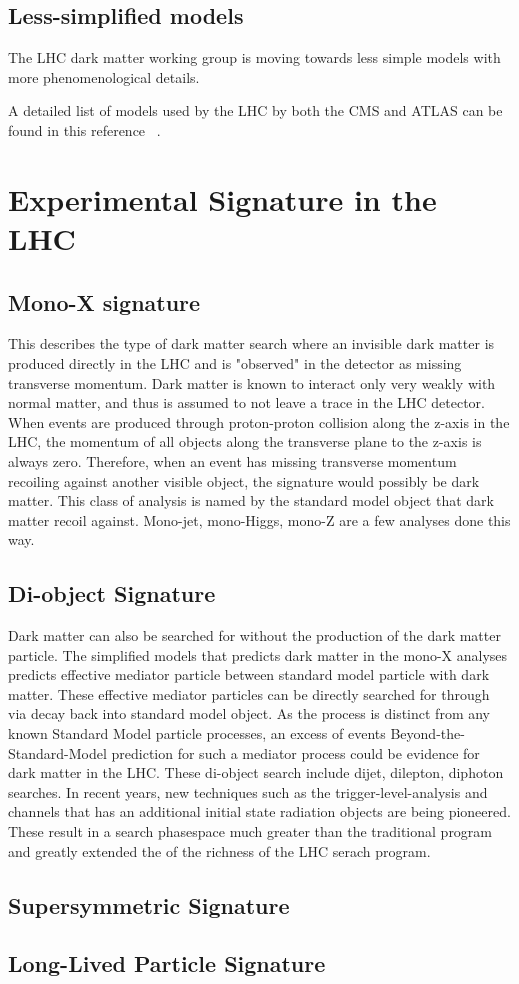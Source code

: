 \subsection{Less-simplified models}
The LHC dark matter working group is moving towards less simple models with more phenomenological details.

A detailed list of models used by the LHC by both the CMS and ATLAS can be found in this reference ~\cite{Abercrombie_2020}.

\section{Experimental Signature in the LHC}
\label{section:signatures}

\subsection{Mono-X signature}
    This describes the type of dark matter search where an invisible dark matter is produced directly in the LHC and is "observed" in the detector as missing transverse momentum.
    Dark matter is known to interact only very weakly with normal matter, and thus is assumed to not leave a trace in the LHC detector. When events are produced through proton-proton collision along the z-axis in the LHC, the momentum of all objects along the transverse plane to the z-axis is always zero. Therefore, when an event has missing transverse momentum recoiling against another visible object, the signature would possibly be dark matter.
This class of analysis is named by the standard model object that dark matter recoil against. Mono-jet, mono-Higgs, mono-Z are a few analyses done this way. 

\subsection{Di-object Signature}
    Dark matter can also be searched for without the production of the dark matter particle. The simplified models that predicts dark matter in the mono-X analyses predicts effective mediator particle between standard model particle with dark matter. These effective mediator particles can be directly searched for through via decay back into standard model object. As the process is distinct from any known Standard Model particle processes, an excess of events Beyond-the-Standard-Model prediction for
    such a mediator process could be evidence for dark matter in the LHC. 
These di-object search include dijet, dilepton, diphoton searches. 
In recent years, new techniques such as the trigger-level-analysis and channels that has an additional initial state radiation objects are being pioneered. These result in a search phasespace much greater than the traditional program and greatly extended the of the richness of the LHC serach program.

\subsection{Supersymmetric Signature}	

\subsection{Long-Lived Particle Signature}

